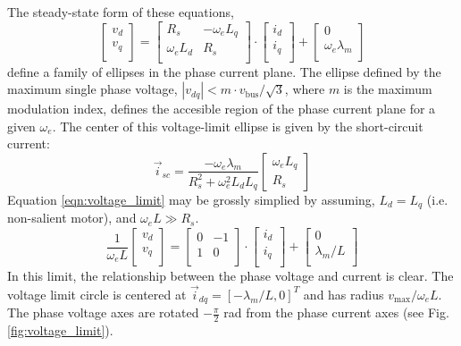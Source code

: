 \documentclass[11pt]{amsart}
\newcommand{\bus}{\mathrm{bus}}
\begin{document}
The steady-state form of these equations,
%
\begin{equation}
  \label{eqn:voltage_limit}
  \begin{bmatrix}
    v_d \\
    v_q \\
  \end{bmatrix}
  =
  \begin{bmatrix}
    R_s          & -\omega_e L_q \\
    \omega_e L_d & R_s \\
  \end{bmatrix}
  \cdot
  \begin{bmatrix}
    i_d \\
    i_q \\
  \end{bmatrix}
  +
  \begin{bmatrix}
    0 \\
    \omega_e \lambda_m \\
  \end{bmatrix}
\end{equation}
%
define a family of ellipses in the phase current plane.  The ellipse
defined by the maximum single phase voltage,
$|v_{dq}| < m \cdot v_{\bus} / \sqrt{3}$, where $m$ is the maximum
modulation index, defines the accesible region of the phase current
plane for a given $\omega_e$.  The center of this voltage-limit
ellipse is given by the short-circuit current:
%
\begin{equation}
  \vec{i}_{sc} =
  \frac{-\omega_e \lambda_m}{R_s^2 + \omega_e^2 L_d L_q}
  \begin{bmatrix}
    \omega_e L_q \\
    R_s
  \end{bmatrix}
\end{equation}
%
Equation \ref{eqn:voltage_limit} may be grossly simplied by assuming,
$L_d = L_q$ (i.e. non-salient motor), and $\omega_e L \gg R_s$.
%
\begin{equation}
  \frac{1}{\omega_e L}
  \begin{bmatrix}
    v_d \\
    v_q \\
  \end{bmatrix}
  =
  \begin{bmatrix}
    0 & -1 \\
    1 & 0 \\
  \end{bmatrix}
  \cdot
  \begin{bmatrix}
    i_d \\
    i_q \\
  \end{bmatrix}
  +
  \begin{bmatrix}
    0 \\
    \lambda_m / L \\
  \end{bmatrix}
\end{equation}
%
In this limit, the relationship between the phase voltage and current
is clear.  The voltage limit circle is centered at
$\vec{i}_{dq} = [-\lambda_m / L, 0]^T$ and has radius
$v_{\max} / \omega_e L$.  The phase voltage axes are rotated
$-\frac{\pi}{2}$ rad from the phase current axes (see
Fig. \ref{fig:voltage_limit}).
\end{document}
